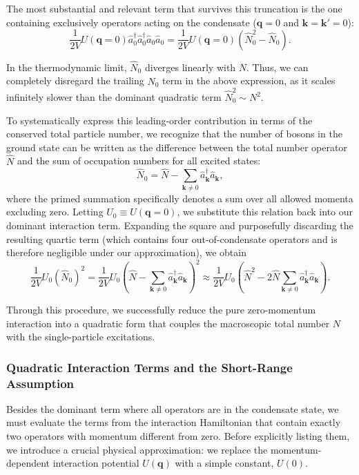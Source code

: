 The most substantial and relevant term that survives this truncation is the one containing exclusively operators acting on the condensate (\( \mathbf{q} = 0 \) and \( \mathbf{k} = \mathbf{k}' = 0 \)):
\[
    \frac{1}{2V} U(\mathbf{q}=0) \hat{a}_0^\dagger \hat{a}_0^\dagger \hat{a}_0 \hat{a}_0 = \frac{1}{2V} U(\mathbf{q}=0) (\hat{N}_0^2 - \hat{N}_0).
\]

In the thermodynamic limit, \( \hat{N}_0 \) diverges linearly with \( N \). Thus, we can completely disregard the trailing \( \hat{N}_0 \) term in the above expression, as it scales infinitely slower than the dominant quadratic term \( \hat{N}_0^2 \sim N^2 \).

To systematically express this leading-order contribution in terms of the conserved total particle number, we recognize that the number of bosons in the ground state can be written as the difference between the total number operator \( \hat{N} \) and the sum of occupation numbers for all excited states:
\[
    \hat{N}_0 = \hat{N} - \sum_{\mathbf{k} \neq 0} \hat{a}^\dagger_{\mathbf{k}} \hat{a}_{\mathbf{k}},
\]
where the primed summation specifically denotes a sum over all allowed momenta excluding zero. Letting \( U_0 \equiv U(\mathbf{q}=0) \), we substitute this relation back into our dominant interaction term. Expanding the square and purposefully discarding the resulting quartic term (which contains four out-of-condensate operators and is therefore negligible under our approximation), we obtain
\[
    \frac{1}{2V} U_0 (\hat{N}_0)^2 = \frac{1}{2V} U_0 \left( \hat{N} - \sum_{\mathbf{k} \neq 0} \hat{a}^\dagger_{\mathbf{k}} \hat{a}_{\mathbf{k}} \right)^2 \approx \frac{1}{2V} U_0 \left( \hat{N}^2 - 2\hat{N} \sum_{\mathbf{k} \neq 0} \hat{a}^\dagger_{\mathbf{k}} \hat{a}_{\mathbf{k}} \right).
\]

Through this procedure, we successfully reduce the pure zero-momentum interaction into a quadratic form that couples the macroscopic total number \( N \) with the single-particle excitations.


\subsubsection{Quadratic Interaction Terms and the Short-Range Assumption}

Besides the dominant term where all operators are in the condensate state, we must evaluate the terms from the interaction Hamiltonian that contain exactly two operators with momentum different from zero. Before explicitly listing them, we introduce a crucial physical approximation: we replace the momentum-dependent interaction potential \( U(\mathbf{q}) \) with a simple constant, \( U(0) \).

